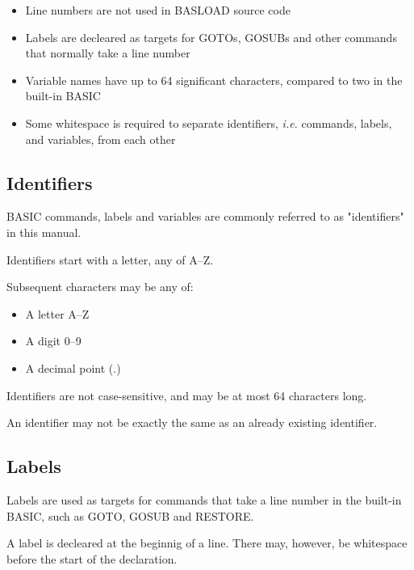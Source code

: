 \documentclass{article}
\begin{document}
        \begin{itemize}
            \item Line numbers are not used in BASLOAD source code
            \item Labels are decleared as targets for GOTOs, GOSUBs and
                  other commands that normally take a line number
            \item Variable names have up to 64 significant characters, compared to two
                  in the built-in BASIC
            \item Some whitespace is required to separate identifiers, 
                  \textit{i.e.} commands, labels, and variables, from each other
                  
        \end{itemize}
    
    \subsection{Identifiers}

        BASIC commands, labels and variables are commonly referred to as "identifiers" in this
        manual.

        Identifiers start with a letter, any of A--Z.

        Subsequent characters may be any of:

        \begin{itemize}
            \item A letter A--Z
            \item A digit 0--9 
            \item A decimal point (.)
        \end{itemize}

        Identifiers are not case-sensitive, and may be at most 64 characters long.

        An identifier may not be exactly the same as an already existing identifier.

    \subsection{Labels}

        Labels are used as targets for commands that take a line number in
        the built-in BASIC, such as GOTO, GOSUB and RESTORE.

        A label is decleared at the beginnig of a line. There may, however,
        be whitespace before the start of the declaration.
\end{document}
